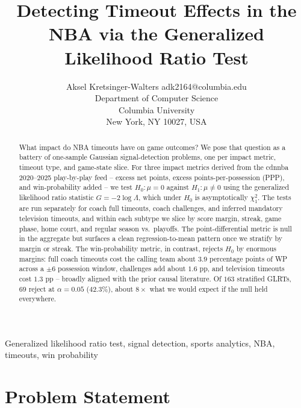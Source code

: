 \documentclass[twoside,11pt]{article}
\begin{document}
\title{Detecting Timeout Effects in the NBA via the Generalized Likelihood Ratio Test}

\author{\name Aksel Kretsinger-Walters \email adk2164@columbia.edu \\
		\addr Department of Computer Science\\
		Columbia University\\
New York, NY 10027, USA}

\editor{}

\maketitle

\begin{abstract}%
		What impact do NBA timeouts have on game outcomes? We pose that
		question as a battery of one-sample Gaussian signal-detection problems,
		one per impact metric, timeout type, and game-state slice. For three
		impact metrics derived from the cdnnba 2020--2025 play-by-play feed
		-- excess net points, excess points-per-possession (PPP), and
		win-probability added -- we test $H_0\!:\mu = 0$ against
		$H_1\!:\mu \neq 0$ using the generalized likelihood ratio statistic
		$G = -2\log\Lambda$, which under $H_0$ is asymptotically $\chi^2_1$.
		The tests are run separately for coach full timeouts, coach
		challenges, and inferred mandatory television timeouts, and within
		each subtype we slice by score margin, streak, game phase, home
		court, and regular season vs.\ playoffs. The point-differential
		metric is null in the aggregate but surfaces a clean regression-to-mean
		pattern once we stratify by margin or streak. The win-probability
		metric, in contrast, rejects $H_0$ by enormous margins: full coach
		timeouts cost the calling team about $3.9$ percentage points of WP
		across a $\pm 6$ possession window, challenges add about $1.6$ pp,
		and television timeouts cost $1.3$ pp -- broadly aligned with the
		prior causal literature. Of $163$ stratified GLRTs, $69$ reject at
		$\alpha = 0.05$ ($42.3\%$), about $8\times$ what we would expect if
		the null held everywhere.
\end{abstract}

\begin{keywords}
		Generalized likelihood ratio test, signal detection, sports analytics, NBA,
		timeouts, win probability
\end{keywords}

\section{Problem Statement}
\label{sec:problem}
\end{document}
